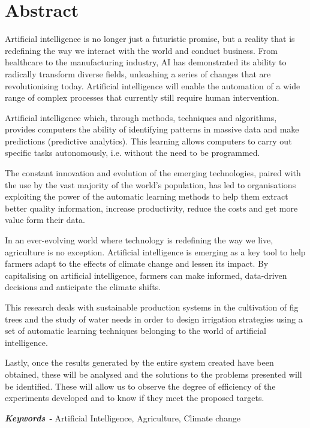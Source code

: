 \renewcommand{\keywords}{{\itshape \bfseries Keywords - }}
\chapter*{Abstract} 

Artificial intelligence is no longer just a futuristic promise, but a reality that is redefining the way we interact with the world and conduct business. From healthcare to the manufacturing industry, AI has demonstrated its ability to radically transform diverse fields, unleashing a series of changes that are revolutionising today. Artificial intelligence will enable the automation of a wide range of complex processes that currently still require human intervention.  

\vspace{5mm}

Artificial intelligence which, through methods, techniques and algorithms, provides computers the ability of identifying patterns in massive data and make predictions (predictive analytics). This learning allows computers to carry out specific tasks autonomously, i.e. without the need to be programmed.

\vspace{5mm}

The constant innovation and evolution of the emerging technologies, paired with the use by the vast majority of the world’s population, has led to organisations exploiting the power of the automatic learning methods to help them extract better quality information, increase productivity, reduce the costs and get more value form their data.

\vspace{5mm}

In an ever-evolving world where technology is redefining the way we live, agriculture is no exception. Artificial intelligence is emerging as a key tool to help farmers adapt to the effects of climate change and lessen its impact. By capitalising on artificial intelligence, farmers can make informed, data-driven decisions and anticipate the climate shifts.

\vspace{5mm}

This research deals with sustainable production systems in the cultivation of fig trees and the study of water needs in order to design irrigation strategies using a set of automatic learning techniques belonging to the world of artificial intelligence.

\vspace{5mm}

Lastly, once the results generated by the entire system created have been obtained, these will be analysed and the solutions to the problems presented will be identified. These will allow us to observe the degree of efficiency of the experiments developed and to know if they meet the proposed targets.


\keywords{Artificial Intelligence, Agriculture, Climate change}
